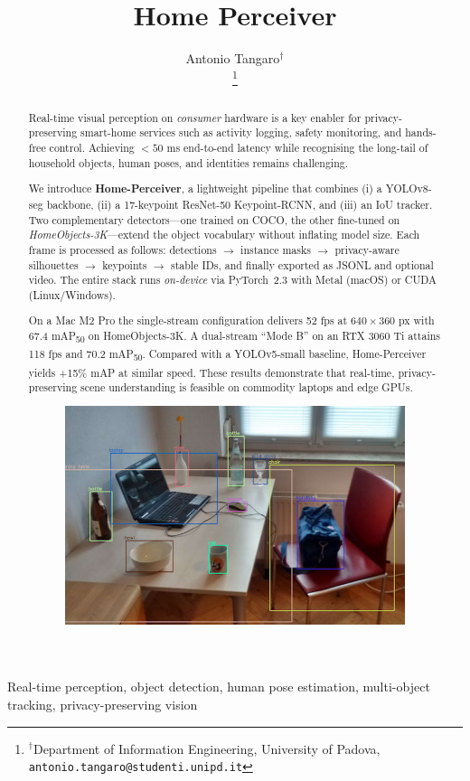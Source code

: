 \documentclass[10pt,conference,letterpaper]{IEEEtran}
\title{Home Perceiver}
\author{Antonio Tangaro$^\dag$\\
  \thanks{$^\dag$Department of Information Engineering, University of Padova, \texttt{antonio.tangaro@studenti.unipd.it}}}
\begin{document}
\maketitle

\begin{abstract}
Real-time visual perception on \emph{consumer} hardware is a key enabler for privacy-preserving smart-home services such as activity logging, safety monitoring, and hands-free control. Achieving $<\!50$ ms end-to-end latency while recognising the long-tail of household objects, human poses, and identities remains challenging.

We introduce \textbf{Home-Perceiver}, a lightweight pipeline that combines (i) a YOLOv8-seg backbone, (ii) a 17-keypoint ResNet-50 Keypoint-RCNN, and (iii) an IoU tracker. Two complementary detectors—one trained on COCO, the other fine-tuned on \emph{HomeObjects-3K}—extend the object vocabulary without inflating model size. Each frame is processed as follows: detections $\rightarrow$ instance masks $\rightarrow$ privacy-aware silhouettes $\rightarrow$ keypoints $\rightarrow$ stable IDs, and finally exported as JSONL and optional video. The entire stack runs \emph{on-device} via PyTorch~2.3 with Metal (macOS) or CUDA (Linux/Windows).

On a Mac M2 Pro the single-stream configuration delivers 52 fps at $640\times360$ px with 67.4 mAP\textsubscript{50} on HomeObjects-3K. A dual-stream “Mode B” on an RTX 3060 Ti attains 118 fps and 70.2 mAP\textsubscript{50}. Compared with a YOLOv5-small baseline, Home-Perceiver yields +15\% mAP at similar speed. These results demonstrate that real-time, privacy-preserving scene understanding is feasible on commodity laptops and edge GPUs.

\begin{figure}[!h]
  \centering
  \includegraphics[width=0.5\linewidth]{./figure/room_obj.jpg}
  \label{fig:esempio}
\end{figure}

\end{abstract}

\begin{IEEEkeywords}
Real-time perception, object detection, human pose estimation, multi-object tracking, privacy-preserving vision
\end{IEEEkeywords}








\clearpage  
\nocite{*}


\end{document}
